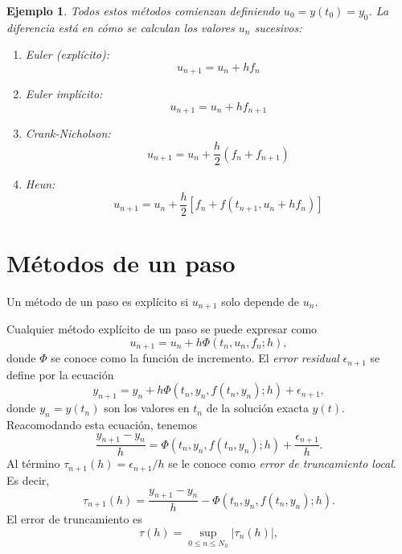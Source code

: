 \documentclass[11pt,letterpaper]{report}
\newtheorem{example}{Ejemplo}
\begin{document}
\begin{example}
  Todos estos métodos comienzan definiendo $u_0=y(t_0)=y_0$. La
  diferencia está en cómo se calculan los valores $u_n$ sucesivos:
  \begin{enumerate}
    \item
      Euler (explícito):
      \begin{equation}
        u_{n+1} = u_n + hf_n
      \end{equation}
    \item
      Euler implícito:
      \begin{equation}
        u_{n+1} = u_n + hf_{n+1}
      \end{equation}
    \item
      Crank-Nicholson:
      \begin{equation}
        u_{n+1} = u_n + \frac{h}{2}(f_n + f_{n+1})
      \end{equation}
    \item
      Heun:
      \begin{equation}
        u_{n+1} = u_n + \frac{h}{2}[f_n + f(t_{n+1},u_n+hf_n)]
      \end{equation}
  \end{enumerate}
\end{example}

\section{Métodos de un paso}

Un método de un paso es explícito si $u_{n+1}$ solo depende de $u_n$.

Cualquier método explícito de un paso se puede expresar como
\begin{equation}
  u_{n+1} = u_n + h \Phi(t_n,u_n,f_n;h)
,\end{equation}
donde $\Phi$ se conoce como la función de incremento.
El \emph{error residual} $\epsilon_{n+1}$ se define por la ecuación
\begin{equation}
  y_{n+1}
  =
  y_n + h\Phi(t_n,y_n,f(t_n,y_n);h) + \epsilon_{n+1}
,\end{equation}
donde $y_n = y(t_n)$ son los valores en $t_n$ de la solución exacta
$y(t)$.
Reacomodando esta ecuación, tenemos
\begin{equation}
  \frac{y_{n+1} - y_n}{h}
  =
  \Phi(t_n,y_n,f(t_n,y_n);h) + \frac{\epsilon_{n+1}}{h}
.\end{equation}
Al término $\tau_{n+1}(h)=\epsilon_{n+1}/h$ se le conoce como
\emph{error de truncamiento local}. Es decir,
\begin{equation}
  \tau_{n+1}(h)
  =
  \frac{y_{n+1} - y_n}{h} -\Phi(t_n,y_n,f(t_n,y_n);h)
.\end{equation}
El error de truncamiento es
\begin{equation}
  \tau(h) = \sup_{0\leq n\leq N_h} |\tau_{n}(h)|
,\end{equation}
\end{document}
